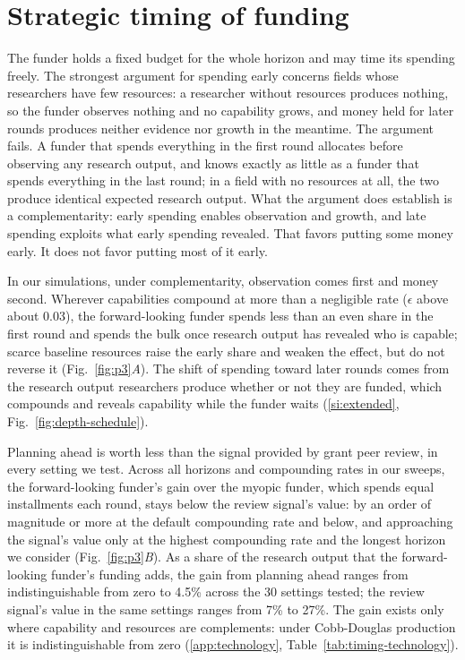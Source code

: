 \section{Strategic timing of funding}\label{si:timing}
The funder holds a fixed budget for the whole horizon and may time its spending freely. The strongest argument for spending early concerns fields whose researchers have few resources: a researcher without resources produces nothing, so the funder observes nothing and no capability grows, and money held for later rounds produces neither evidence nor growth in the meantime. The argument fails. A funder that spends everything in the first round allocates before observing any research output, and knows exactly as little as a funder that spends everything in the last round; in a field with no resources at all, the two produce identical expected research output. What the argument does establish is a complementarity: early spending enables observation and growth, and late spending exploits what early spending revealed. That favors putting some money early. It does not favor putting most of it early.

In our simulations, under complementarity, observation comes first and money second. Wherever capabilities compound at more than a negligible rate ($\epsilon$ above about 0.03), the forward-looking funder spends less than an even share in the first round and spends the bulk once research output has revealed who is capable; scarce baseline resources raise the early share and weaken the effect, but do not reverse it (Fig.~\ref{fig:p3}\textit{A}). The shift of spending toward later rounds comes from the research output researchers produce whether or not they are funded, which compounds and reveals capability while the funder waits (\ref{si:extended}, Fig.~\ref{fig:depth-schedule}).

Planning ahead is worth less than the signal provided by grant peer review, in every setting we test. Across all horizons and compounding rates in our sweeps, the forward-looking funder's gain over the myopic funder, which spends equal installments each round, stays below the review signal's value: by an order of magnitude or more at the default compounding rate and below, and approaching the signal's value only at the highest compounding rate and the longest horizon we consider (Fig.~\ref{fig:p3}\textit{B}). As a share of the research output that the forward-looking funder's funding adds, the gain from planning ahead ranges from indistinguishable from zero to 4.5\% across the 30 settings tested; the review signal's value in the same settings ranges from 7\% to 27\%. The gain exists only where capability and resources are complements: under Cobb-Douglas production it is indistinguishable from zero (\ref{app:technology}, Table~\ref{tab:timing-technology}).

